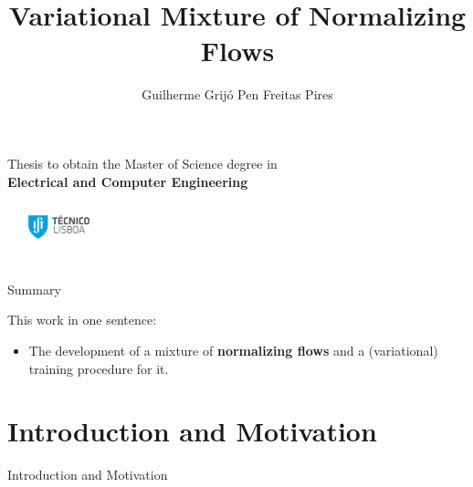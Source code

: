 \documentclass[12pt,ignorenonframetext,]{beamer}
\title{Variational Mixture of Normalizing Flows}
\author{Guilherme Grijó Pen Freitas Pires}
\begin{document}
{
\begin{frame}
  \titlepage
  \begin{center}
    \centering
    Thesis to obtain the Master of Science degree in \\
    \textbf{Electrical and Computer Engineering} \\
    \includegraphics[width=3cm]{IST_A_CMYK_POS.pdf}
  \end{center}
\end{frame}
}

\begin{frame}{Summary}
\protect\hypertarget{summary}{}

This work in one sentence:

\begin{itemize}
    \item The development of a mixture of \textbf{normalizing flows}
    and a (variational) training procedure for it.
\end{itemize}

\end{frame}

\hypertarget{introduction-and-motivation}{%
\section{Introduction and
Motivation}\label{introduction-and-motivation}}

\begin{frame}{Introduction and Motivation}
\protect\hypertarget{introduction-and-motivation-1}{}

\begin{itemize}
    \begin{itemize}
    \end{itemize}
\end{itemize}

\end{frame}
\end{document}
